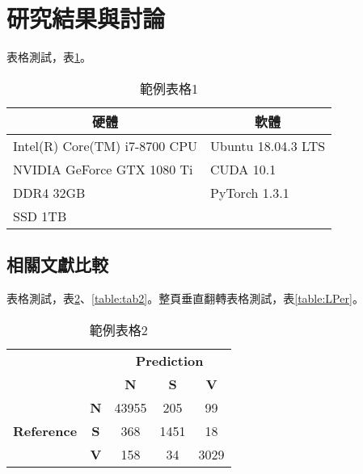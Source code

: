 
\section{研究結果與討論}

表格測試，表\ref{table:hardware_software}。

\begin{table}[htbp]
    \centering
    \caption{範例表格1}
    \label{table:hardware_software}
    \begin{tabular}{p{}p{}}
        \toprule
        \multicolumn{1}{c}{\textbf{硬體}} & \multicolumn{1}{c}{\textbf{軟體}} \\ 
        \midrule
        Intel(R) Core(TM) i7-8700 CPU     & Ubuntu 18.04.3 LTS               \\
        NVIDIA GeForce GTX 1080 Ti        & CUDA 10.1                        \\
        DDR4 32GB                         & PyTorch 1.3.1                    \\
        SSD 1TB                           &                                  \\
        \bottomrule
    \end{tabular}
\end{table}

\subsection{相關文獻比較}

表格測試，表\ref{table:confusion_matrix}、\ref{table:tab2}。整頁垂直翻轉表格測試，表\ref{table:LPer}。

\begin{table}[htbp]
    \centering
    \caption{範例表格2} 
    \label{table:confusion_matrix}
    \begin{tabular}{ccccc}
        \toprule
        & & \multicolumn{3}{c}{\textbf{Prediction}} \\
        \cmidrule{3-5}
        & & \textbf{N} & \textbf{S} & \textbf{V} \\
        \midrule
        \multirow{3}{*}{\textbf{Reference}} & \textbf{N} & 43955 & 205 & 99 \\
        & \textbf{S} & 368 & 1451 & 18 \\
        & \textbf{V} & 158 & 34 & 3029 \\
        \bottomrule
    \end{tabular} 
\end{table}

